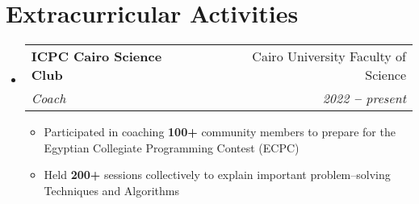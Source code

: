 \documentclass[letterpaper,11pt]{article}
\makeatletter
\newcommand{\resumeItem}[1]{
  \item\small{
    {#1 \vspace{-2pt}}
  }
}
\newcommand{\resumeSubheading}[4]{
  \vspace{-2pt}\item
    \begin{tabular*}{0.97\textwidth}[t]{l@{\extracolsep{\fill}}r}
      \textbf{#1} & #2 \\
      \textit{\small#3} & \textit{\small #4} \\
    \end{tabular*}\vspace{-7pt}
}
\newcommand{\resumeSubHeadingListStart}{\begin{itemize}[leftmargin=0.15in, label={}]}
\newcommand{\resumeSubHeadingListEnd}{\end{itemize}}
\newcommand{\resumeItemListStart}{\begin{itemize}}
\newcommand{\resumeItemListEnd}{\end{itemize}\vspace{-5pt}}
\makeatother
\begin{document}



\section{Extracurricular Activities}

\resumeSubHeadingListStart

\resumeSubheading{ICPC Cairo Science Club \href{https://www.facebook.com/sci.cpc}{\faLink}}{Cairo University Faculty of Science}
{Coach} {2022 \textbf{--} present}
\resumeItemListStart
\resumeItem{Participated in coaching \textbf{100+} community members to prepare for the Egyptian Collegiate Programming Contest (ECPC)}
\resumeItem{Held \textbf{200+} sessions collectively to explain important problem–solving Techniques and Algorithms}
\resumeItemListEnd

\resumeSubHeadingListEnd
\end{document}
